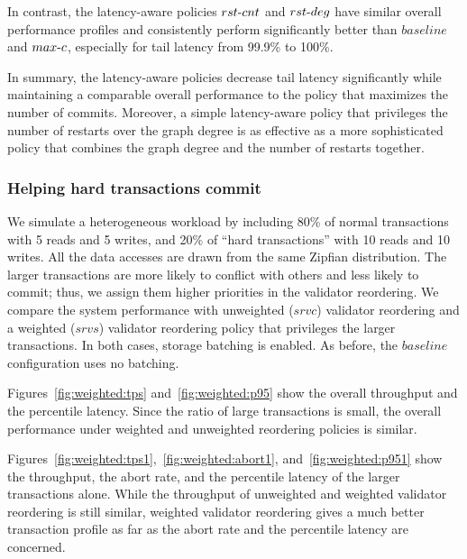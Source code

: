 In contrast, the latency-aware policies $rst\hbox{-}cnt$ and $rst\hbox{-}deg$ have similar overall performance profiles and consistently perform significantly better than $baseline$ and $max\hbox{-}c$, especially for tail latency from 99.9\% to 100\%.  

In summary, the latency-aware policies decrease tail latency significantly while maintaining a comparable overall performance to the policy that maximizes the number of commits. Moreover, a simple latency-aware policy that privileges the number of restarts over the graph degree is as effective as a more sophisticated policy that combines the graph degree and the number of restarts together.


\subsubsection{Helping hard transactions commit}

We simulate a heterogeneous workload by including 80\% of normal transactions with 5 reads and 5 writes, and 20\% of ``hard transactions'' with 10 reads and 10 writes. All the data accesses are drawn from the same Zipfian distribution. The larger transactions are more likely to conflict with others and less likely to commit; thus, we assign them higher priorities in the validator reordering. We compare the system performance with unweighted ($srvc$) validator reordering and a weighted ($srvs$) validator reordering policy that privileges the larger transactions. In both cases, storage batching is enabled. As before, the $baseline$ configuration uses no batching.

Figures~\ref{fig:weighted:tps} and~\ref{fig:weighted:p95} show the overall throughput and the percentile latency. Since the ratio of large transactions is small, the overall performance under weighted and unweighted reordering policies is similar.

Figures~\ref{fig:weighted:tps1},~\ref{fig:weighted:abort1}, and~\ref{fig:weighted:p951} show the throughput, the abort rate, and the percentile latency of the larger transactions alone. While the throughput of unweighted and weighted validator reordering is still similar, weighted validator reordering gives a much better transaction profile as far as the abort rate and the percentile latency are concerned.
